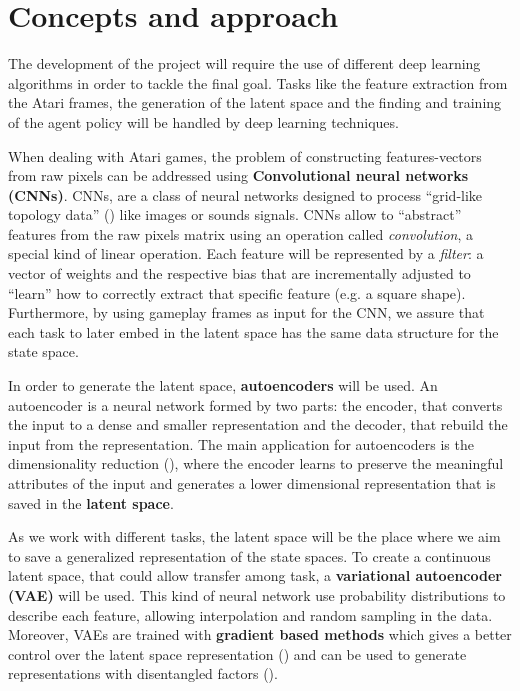 \section{Concepts and approach}

The development of the project will require the use of different deep learning algorithms in order to tackle the final goal. Tasks like the feature extraction from the Atari frames, the generation of the latent space and the finding and training of the agent policy will be handled by deep learning techniques.

When dealing with Atari games, the problem of constructing features-vectors from raw pixels can be addressed using \textbf{Convolutional neural networks (CNNs)}.
CNNs, are a class of neural networks designed to process ``grid-like topology data'' (\cite{goodfellow2016deep}) like images or sounds signals. CNNs allow to ``abstract'' features from the raw pixels matrix using an operation called \textit{convolution}, a special kind of linear operation. Each feature will be represented by a \textit{filter}: a vector of weights and the respective bias that are incrementally adjusted to ``learn'' how to correctly extract that specific feature (e.g. a square shape). 
Furthermore, by using gameplay frames as input for the CNN, we assure that each task to later embed in the latent space has the same data structure for the state space.  

In order to generate the latent space, \textbf{autoencoders} will be used. An autoencoder is a neural network formed by two parts: the encoder, that converts the input to a dense and smaller representation and the decoder, that rebuild the input from the representation. The main application for autoencoders is the dimensionality reduction (\cite{Hinton504}), where the encoder learns to preserve the meaningful attributes of the input and generates a lower dimensional representation that is saved in the \textbf{latent space}. 

As we work with different tasks, the latent space will be the place where we aim to save a generalized representation of the state spaces. To create a continuous latent space, that could allow transfer among task, a \textbf{variational autoencoder (VAE)} will be used. This kind of neural network use probability distributions to describe each feature, allowing interpolation and random sampling in the data. Moreover, VAEs are trained with \textbf{gradient based methods} which gives a better control over the latent space representation (\cite{goodfellow2016deep}) and can be used to generate representations with disentangled factors (\cite{2016arXiv160605579H}).

